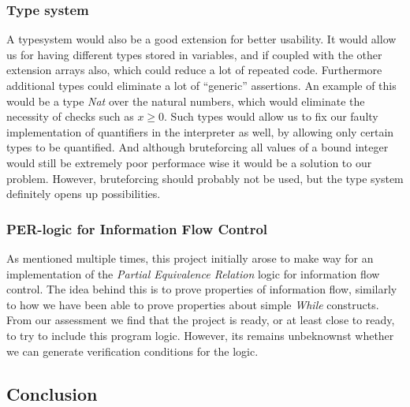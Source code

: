 \subsubsection{Type system}
A typesystem would also be a good extension for better usability. 
It would allow us for having different types stored in variables, and if coupled with the other extension arrays also, which could reduce a lot of repeated code. 
Furthermore additional types could eliminate a lot of ``generic'' assertions. 
An example of this would be a type \textit{Nat} over the natural numbers, which would eliminate the necessity of checks such as $x \ge 0$. 
Such types would allow us to fix our faulty implementation of quantifiers in the interpreter as well, by allowing only certain types to be quantified. 
And although bruteforcing all values of a bound integer would still be extremely poor performace wise it would be a solution to our problem. However, bruteforcing should probably not be used, but the type system definitely opens up possibilities.

\subsubsection{PER-logic for Information Flow Control}
As mentioned multiple times, this project initially arose to make way for an implementation of the \textit{Partial Equivalence Relation} logic for information flow control\cite{}. 
The idea behind this is to prove properties of information flow, similarly to how we have been able to prove properties about simple \textit{While} constructs. 
From our assessment we find that the project is ready, or at least close to ready, to try to include this program logic. 
However, its remains unbeknownst whether we can generate verification conditions for the logic.

\subsection{Conclusion}
